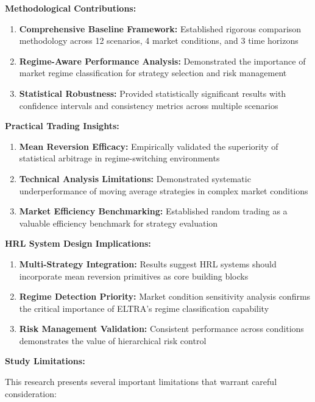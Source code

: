 \documentclass[11pt]{article}
\begin{document}
\textbf{Methodological Contributions:}
\begin{enumerate}
\item \textbf{Comprehensive Baseline Framework:} Established rigorous comparison methodology across 12 scenarios, 4 market conditions, and 3 time horizons
\item \textbf{Regime-Aware Performance Analysis:} Demonstrated the importance of market regime classification for strategy selection and risk management
\item \textbf{Statistical Robustness:} Provided statistically significant results with confidence intervals and consistency metrics across multiple scenarios

\end{enumerate}
\textbf{Practical Trading Insights:}
\begin{enumerate}
\item \textbf{Mean Reversion Efficacy:} Empirically validated the superiority of statistical arbitrage in regime-switching environments
\item \textbf{Technical Analysis Limitations:} Demonstrated systematic underperformance of moving average strategies in complex market conditions
\item \textbf{Market Efficiency Benchmarking:} Established random trading as a valuable efficiency benchmark for strategy evaluation

\end{enumerate}
\textbf{HRL System Design Implications:}
\begin{enumerate}
\item \textbf{Multi-Strategy Integration:} Results suggest HRL systems should incorporate mean reversion primitives as core building blocks
\item \textbf{Regime Detection Priority:} Market condition sensitivity analysis confirms the critical importance of ELTRA's regime classification capability
\item \textbf{Risk Management Validation:} Consistent performance across conditions demonstrates the value of hierarchical risk control

\end{enumerate}
\textbf{Study Limitations:}

This research presents several important limitations that warrant careful consideration:
\end{document}
